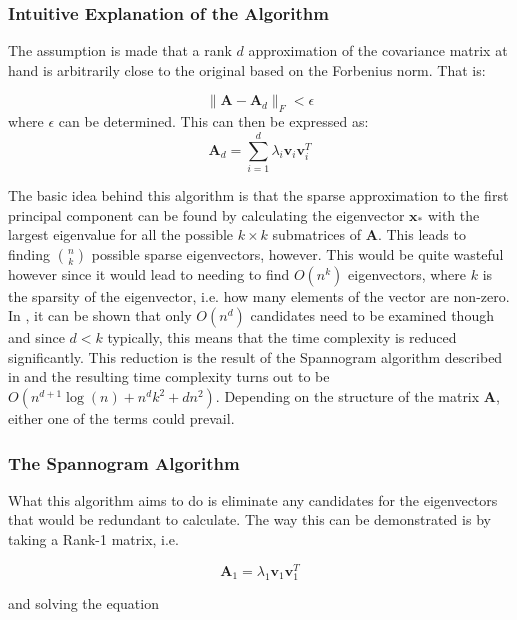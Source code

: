 \documentclass[11pt,a4paper]{article}
\begin{document}
\subsubsection{Intuitive Explanation of the Algorithm}
The assumption is made that a rank $d$ approximation of the covariance matrix at hand is arbitrarily close to the original based on the Forbenius norm. That is:

\begin{equation*}
\|\mathbf{A} - \mathbf{A}_d\|_F < \epsilon
\end{equation*}
where $\epsilon$ can be determined. This can then be expressed as:
\begin{equation*}
\mathbf{A}_d = \sum_{i=1}^d \lambda_i \mathbf{v}_i \mathbf{v}_i^T
\end{equation*}

The basic idea behind this algorithm is that the sparse approximation to the first principal component can be found by calculating the eigenvector $\mathbf{x}_*$ with the largest eigenvalue for all the possible $k\times k$ submatrices of $\mathbf{A}$. This leads to finding $n \choose k$ possible sparse eigenvectors, however. This would be quite wasteful however since it would lead to needing to find $O\left( n^k\right)$ eigenvectors, where $k$ is the sparsity of the eigenvector, i.e. how many elements of the vector are non-zero. In \cite{dimakis}, it can be shown that only $O\left(n^d\right)$ candidates need to be examined though and since $d < k$ typically, this means that the time complexity is reduced significantly. This reduction is the result of the Spannogram algorithm described in \cite{dimakis} and the resulting time complexity turns out to be $O \left( n^{d+1}\log(n) + n^d k^2 + dn^2\right)$. Depending on the structure of the matrix $\mathbf{A}$, either one of the terms could prevail.

\subsubsection{The Spannogram Algorithm}

What this algorithm aims to do is eliminate any candidates for the eigenvectors that would be redundant to calculate. The way this can be demonstrated is by taking a Rank-1 matrix, i.e.

\begin{equation*}
\mathbf{A}_1 = \lambda_1 \mathbf{v}_1 \mathbf{v}_1^T
\end{equation*}

and solving the equation
\end{document}
